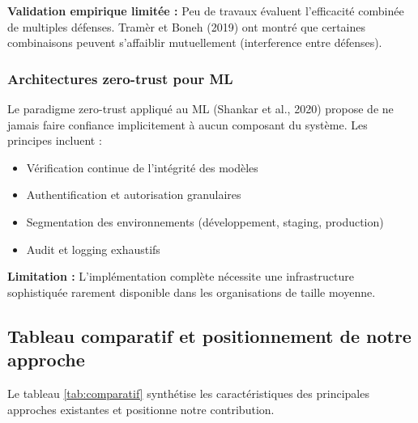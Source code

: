 \textbf{Validation empirique limitée :} Peu de travaux évaluent l'efficacité combinée de multiples défenses. Tramèr et Boneh (2019) ont montré que certaines combinaisons peuvent s'affaiblir mutuellement (interference entre défenses).

\subsubsection{Architectures zero-trust pour ML}

Le paradigme zero-trust appliqué au ML (Shankar et al., 2020) propose de ne jamais faire confiance implicitement à aucun composant du système. Les principes incluent :
\begin{itemize}
    \item Vérification continue de l'intégrité des modèles
    \item Authentification et autorisation granulaires
    \item Segmentation des environnements (développement, staging, production)
    \item Audit et logging exhaustifs
\end{itemize}

\textbf{Limitation :} L'implémentation complète nécessite une infrastructure sophistiquée rarement disponible dans les organisations de taille moyenne.

\subsection{Tableau comparatif et positionnement de notre approche}
\label{subsec:positionnement}

Le tableau \ref{tab:comparatif} synthétise les caractéristiques des principales approches existantes et positionne notre contribution.

